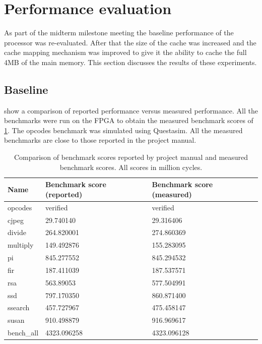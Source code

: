 \section{Performance evaluation}
\label{sec:performance}
As part of the midterm milestone meeting the baseline performance of the processor was re-evaluated. After that the size of the cache was increased and the cache mapping mechanism was improved to give it the ability to cache the full 4MB of the main memory. This section discusses the results of these experiments.

\subsection{Baseline}
 show a comparison of reported performance versus measured performance. All the benchmarks were run on the FPGA to obtain the measured benchmark scores of \cref{tab:baselinebench}. The opcodes benchmark was simulated using Questasim. All the measured benchmarks are close to those reported in the project manual.
\begin{table}[H]
\centering
\begin{tabular}{lll}
\hline
Name       & Benchmark score (reported) & Benchmark score (measured) \\ \hline
opcodes    & verified                   & verified                   \\
cjpeg      & 29.740140                  & 29.316406                            \\
divide     & 264.820001                 & 274.860369                            \\
multiply   & 149.492876                 &   155.283095                          \\
pi         & 845.277552                 &   845.294532                          \\
fir        & 187.411039                 &  187.537571                           \\
rsa        & 563.89053                  &   577.504991                          \\
ssd        & 797.170350                 &  860.871400                           \\
ssearch    & 457.727967                 &  475.458147                           \\
susan      & 910.498879                 &  916.969617                           \\
bench\_all & 4323.096258                &  4323.096128                          \\ \hline
\end{tabular}
\caption{Comparison of benchmark scores reported by project manual and measured benchmark scores. All scores in million cycles.}
\label{tab:baselinebench}
\end{table}
